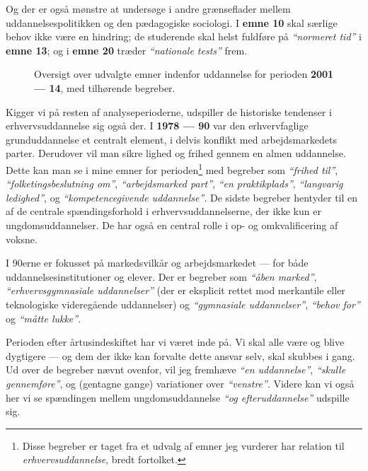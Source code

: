 Og der er også mønstre at undersøge i andre grænseflader mellem uddannelsespolitikken og den pædagogiske sociologi.
I \textbf{emne 10} skal særlige behov ikke være en hindring; de studerende skal helst fuldføre på \textit{“normeret tid”} i \textbf{emne 13}; og i \textbf{emne 20} træder \textit{“nationale tests”} frem.

\begin{figure}
\begin{adjustwidth}{-1in}{-1in}
 
\end{adjustwidth}
\caption{Oversigt over udvalgte emner indenfor uddannelse for perioden \textbf{2001 --- 14}, med tilhørende begreber.}
\label{fig:termsEdu}
\end{figure}

Kigger vi på resten af analyseperioderne, udspiller de historiske tendenser i erhvervsuddannelse sig også der.
I \textbf{1978 --- 90} var den erhvervfaglige grunduddannelse et centralt element, i delvis konflikt med arbejdsmarkedets parter.
Derudover vil man sikre lighed og frihed gennem en almen uddannelse.
Dette kan man se i mine emner for perioden\footnote{
Disse begreber er taget fra et udvalg af emner jeg vurderer har relation til \textit{erhvervsuddannelse}, bredt fortolket.}
med begreber som \textit{“frihed til”}, \textit{“folketingsbeslutning om”}, \textit{“arbejdsmarked part”}, \textit{“en praktikplads”}, \textit{“langvarig ledighed”}, og \textit{“kompetencegivende uddannelse”}.
De sidste begreber hentyder til en af de centrale spændingsforhold i erhvervsuddannelserne, der ikke kun er ungdomsuddannelser.
De har også en central rolle i op- og omkvalificering af voksne.

I 90erne er fokusset på markedsvilkår og arbejdsmarkedet — for både uddannelsesinstitutioner og elever.
Der er begreber som \textit{“åben marked”}, \textit{“erhvervsgymnasiale uddannelser”} (der er eksplicit rettet mod merkantile eller teknologiske videregående uddannelser) og \textit{“gymnasiale uddannelser”}, \textit{“behov for”} og \textit{“måtte lukke”}.

Perioden efter årtusindeskiftet har vi været inde på.
Vi skal alle være og blive dygtigere — og dem der ikke kan forvalte dette ansvar selv, skal skubbes i gang.
Ud over de begreber nævnt ovenfor, vil jeg fremhæve \textit{“en uddannelse”}, \textit{“skulle gennemføre”}, og (gentagne gange) variationer over \textit{“venstre”}.
Videre kan vi også her vi se spændingen mellem ungdomsuddannelse \textit{“og efteruddannelse”} udspille sig.

